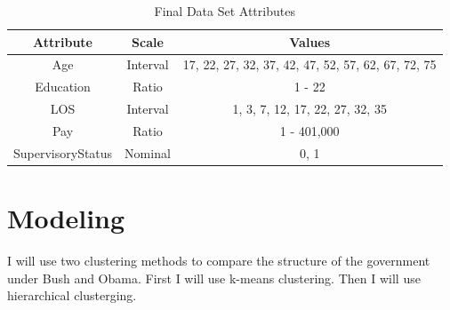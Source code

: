 \documentclass{article}
\begin{document}
    \begin{center}
        \begin{table}
            \centering
            \begin{tabular}{ |c|c|c| }
                \hline
                Attribute & Scale & Values \\
                \hline
                Age & Interval & 17, 22, 27, 32, 37, 42, 47, 52, 57, 62, 67, 72, 75 \\
                Education & Ratio & 1 - 22 \\
                LOS & Interval & 1, 3, 7, 12, 17, 22, 27, 32, 35 \\
                Pay & Ratio & 1 - 401,000 \\
                SupervisoryStatus & Nominal & 0, 1 \\
                \hline
            \end{tabular}
            \caption{Final Data Set Attributes}
            \label{tab:1}
        \end{table}
    \end{center}

\section{Modeling}
I will use two clustering methods to compare the structure of the government under Bush and Obama. First I will use k-means clustering. Then I will use hierarchical clusterging.
\end{document}
